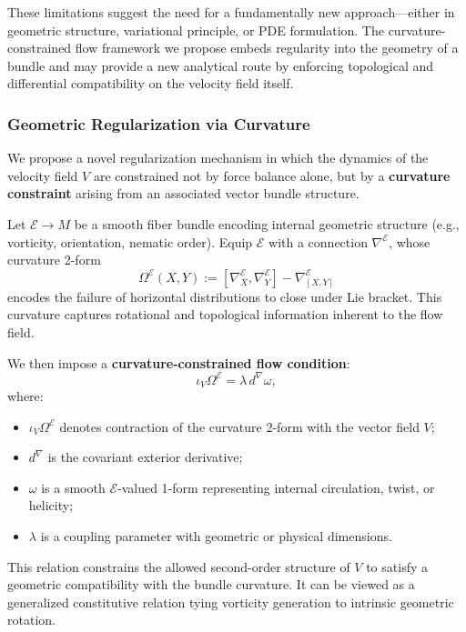 These limitations suggest the need for a fundamentally new approach—either in geometric structure, variational principle, or PDE formulation. The curvature-constrained flow framework we propose embeds regularity into the geometry of a bundle and may provide a new analytical route by enforcing topological and differential compatibility on the velocity field itself.


\subsubsection{Geometric Regularization via Curvature} We propose a novel regularization mechanism in which the dynamics of the velocity field $V$ are constrained not by force balance alone, but by a \textbf{curvature constraint} arising from an associated vector bundle structure.

Let $\mathcal{E} \to M$ be a smooth fiber bundle encoding internal geometric structure (e.g., vorticity, orientation, nematic order). Equip $\mathcal{E}$ with a connection $\nabla^\mathcal{E}$, whose curvature 2-form
\begin{equation}
\label{eq:curvature_form}
\Omega^\mathcal{E}(X, Y) := \left[ \nabla^\mathcal{E}_X, \nabla^\mathcal{E}_Y \right] - \nabla^\mathcal{E}_{[X,Y]}
\end{equation}
encodes the failure of horizontal distributions to close under Lie bracket. This curvature captures rotational and topological information inherent to the flow field.

We then impose a \textbf{curvature-constrained flow condition}:
\begin{equation}
\label{eq:curvature_constraint}
\iota_V \Omega^\mathcal{E} = \lambda \, d^\nabla \omega,
\end{equation}
where:
\begin{itemize}
  \item $\iota_V \Omega^\mathcal{E}$ denotes contraction of the curvature 2-form with the vector field $V$;
  \item $d^\nabla$ is the covariant exterior derivative;
  \item $\omega$ is a smooth $\mathcal{E}$-valued 1-form representing internal circulation, twist, or helicity;
  \item $\lambda$ is a coupling parameter with geometric or physical dimensions.
\end{itemize}

This relation constrains the allowed second-order structure of $V$ to satisfy a geometric compatibility with the bundle curvature. It can be viewed as a generalized constitutive relation tying vorticity generation to intrinsic geometric rotation.


